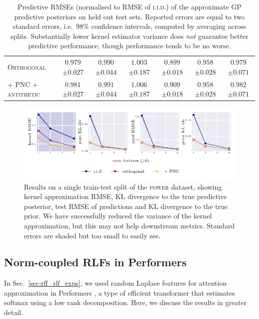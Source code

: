 \begin{table}[h!]
{\begin{tabular}{l c c c c c c}
\scshape{Orthogonal} & $0.979$ {\tiny $\pm 0.027$} & $0.990$ {\tiny $\pm 0.044$} & $1.003$ {\tiny $\pm 0.187$} & $0.899$ {\tiny $\pm 0.018$} & $0.958$ {\tiny $\pm 0.028$} & $0.979$ {\tiny $\pm 0.071$} \\
\scshape{+ PNC + antithetic} & $0.981$ {\tiny $\pm 0.027$} & $0.991$ {\tiny $\pm 0.044$} & $1.006$ {\tiny $\pm 0.187$} & $0.909$ {\tiny $\pm 0.018$} & $0.958$ {\tiny $\pm 0.028$} & $0.982$ {\tiny $\pm 0.071$} \\
\bottomrule
\end{tabular}
}
\vspace{2mm}
\caption{
    Predictive RMSEs (normalised to RMSE of {\scshape i.i.d.}) of the approximate GP predictive posteriors on held out test sets.
    Reported errors are equal to two standard errors, i.e.~$98\%$ confidence intervals, computed by averaging across splits.
   Substantially lower kernel estimator variance does \emph{not} guarantee better predictive performance, though performance tends to be no worse.}
\label{tab:pred-rmse}
\end{table}
\begin{figure}
    \centering
    \includegraphics{images/power_results.pdf}
    \caption{Results on a single train-test split of the {\scshape{power}} dataset, showing kernel approximation RMSE, KL divergence to the true predictive posterior, test RMSE of predictions and KL divergence to the true prior.
    We have successfully reduced the variance of the kernel approximation, but this may not help downstream metrics.
    Standard errors are shaded but too small to easily see.}
    \label{fig:power_results}
\end{figure}

\subsection{Norm-coupled RLFs in Performers} \label{app:performers}
In Sec.~\ref{sec:rff_rlf_exps}, we used random Laplace features for attention approximation in Performers \citep{choromanski2020rethinking}, a type of efficient transformer that estimates softmax using a low rank decomposition.
Here, we discuss the results in greater detail.


